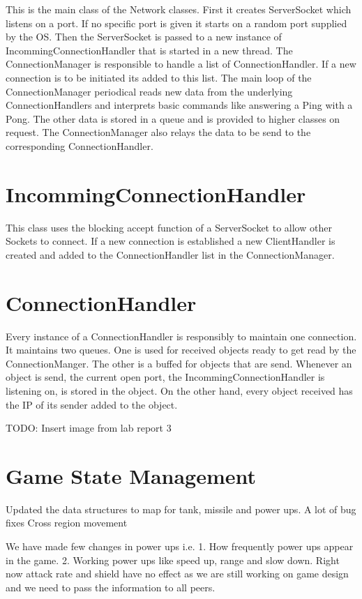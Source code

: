 \documentclass[paper=a4, fontsize=11pt]{scrartcl}
\numberwithin{equation}{section}
\numberwithin{figure}{section}
\numberwithin{table}{section}
\begin{document}
This is the main class of the Network classes. First it creates ServerSocket which listens on a port. If no specific port is given it starts on a random port supplied by the OS. Then the ServerSocket is passed to a new instance of IncommingConnectionHandler that is started in a new thread. The ConnectionManager is responsible to handle a list of ConnectionHandler. If a new connection is to be initiated its added to this list. The main loop of the ConnectionManager periodical reads new data from the underlying ConnectionHandlers and interprets basic commands like answering a Ping with a Pong. The other data is stored in a queue and is provided to higher classes on request. The ConnectionManager also relays the data to be send to the corresponding ConnectionHandler.


\section{IncommingConnectionHandler}
This class uses the blocking accept function of a ServerSocket to allow other Sockets to connect. If a new connection is established a new ClientHandler is created and added to the ConnectionHandler list in the ConnectionManager.

\section{ConnectionHandler}

Every instance of a ConnectionHandler is responsibly to maintain one connection. It maintains two queues. One is used for received objects ready to get read by the ConnectionManger. The other is a buffed for objects that are send.
Whenever an object is send, the current open port, the IncommingConnectionHandler is listening on, is stored in the object. On the other hand, every object received has the IP of its sender added to the object.

TODO: Insert image from lab report 3

\section{Game State Management}
 Updated the data structures to map for tank, missile and power ups.
 A lot of bug fixes
 Cross region movement

We have made few changes in power ups i.e.
1. How frequently power ups appear in the game.
2. Working power ups like speed up, range and slow down.
Right now attack rate and shield have no effect as we are still working on game design and we need to
pass the information to all peers.
\end{document}
